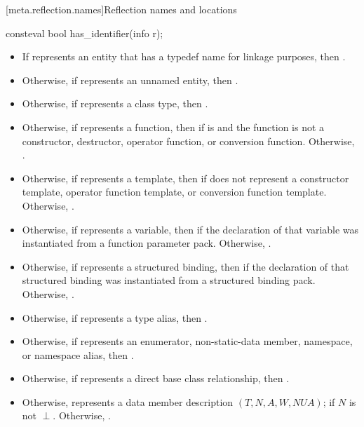 [meta.reflection.names]{Reflection names and locations}

%
\begin{itemdecl}
consteval bool has_identifier(info r);
\end{itemdecl}

\begin{itemdescr}
\pnum
\returns
\begin{itemize}
\item
  If  represents an entity
  that has a typedef name for linkage purposes,
  then .
\item
  Otherwise, if  represents an unnamed entity,
  then .
\item
  Otherwise, if  represents a class type,
  then .
\item
  Otherwise, if  represents a function,
  then  if  is 
  and the function is not a
  constructor,
  destructor,
  operator function, or
  conversion function.
  Otherwise, .
\item
  Otherwise, if  represents a template,
  then  if  does not represent a
  constructor template,
  operator function template,
  or conversion function template.
  Otherwise, .
\item
  Otherwise, if  represents a variable,
  then  if the declaration of that variable
  was instantiated from a function parameter pack.
  Otherwise, .
\item
  Otherwise, if  represents a structured binding,
  then  if the declaration of that structured binding
  was instantiated from a structured binding pack.
  Otherwise, .
\item
  Otherwise, if  represents a type alias,
  then .
\item
  Otherwise, if  represents an
  enumerator,
  non-static-data member,
  namespace, or
  namespace alias,
  then .
\item
  Otherwise, if  represents a direct base class relationship,
  then .
\item
  Otherwise,  represents a data member description
  $(T, N, A, W, \mathit{NUA})$;
   if $N$ is not $\perp$.
  Otherwise, .
\end{itemize}
\end{itemdescr}

